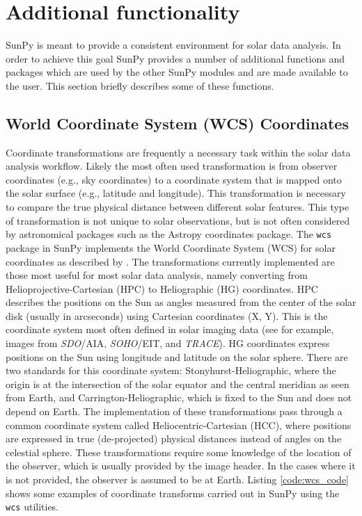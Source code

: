\section{Additional functionality}\label{sec:util}
SunPy is meant to provide a consistent environment for solar data analysis. In 
order to achieve this goal SunPy provides a number of additional functions and packages which 
are used by the other SunPy modules and are made available to the user. This section 
briefly describes some of these functions.
	
\subsection{World Coordinate System (WCS) Coordinates}\label{ssec:util:wcs}
Coordinate transformations are frequently a necessary task within the solar 
data analysis workflow. Likely the most often used transformation is from 
observer coordinates (e.g., sky coordinates) to a coordinate system that is 
mapped onto the solar surface (e.g., latitude and longitude). This 
transformation is necessary to compare the true physical distance between 
different solar features. This type of transformation is not unique
to solar observations, but is not often considered by astronomical packages
such as the Astropy 
coordinates package. The \texttt{wcs} package in SunPy implements the World Coordinate 
System (WCS) for solar coordinates as described by \cite{thompson2006}. The 
transformations currently implemented are those most useful 
for most solar data analysis, namely converting from Helioprojective-Cartesian 
(HPC) to Heliographic (HG) coordinates. HPC describes the positions on 
the Sun as angles measured from the center of the solar disk (usually in 
arcseconds) using Cartesian coordinates (X, Y). This is the coordinate system 
most often defined in solar imaging data (see for example, images from 
\textit{SDO}/AIA, \textit{SOHO}/EIT, and \textit{TRACE}). 
HG coordinates express positions on the Sun using longitude and latitude on 
the solar sphere. There are two standards for this coordinate system:
Stonyhurst-Heliographic, where the origin is at the intersection of the solar 
equator and the central meridian as seen from Earth, and 
Carrington-Heliographic, which is fixed to the Sun and does not depend on Earth. The 
implementation of these transformations pass through a common coordinate system 
called Heliocentric-Cartesian (HCC), where positions are expressed in true 
(de-projected) physical distances instead of angles on the celestial sphere.
These transformations require some knowledge of the location of the observer, 
which is usually provided by the image header. In the cases where it is 
not provided, the observer is assumed to be at Earth. Listing \ref{code:wcs_code} shows 
some examples of coordinate transforms carried out in SunPy using the 
\texttt{wcs} utilities. 

